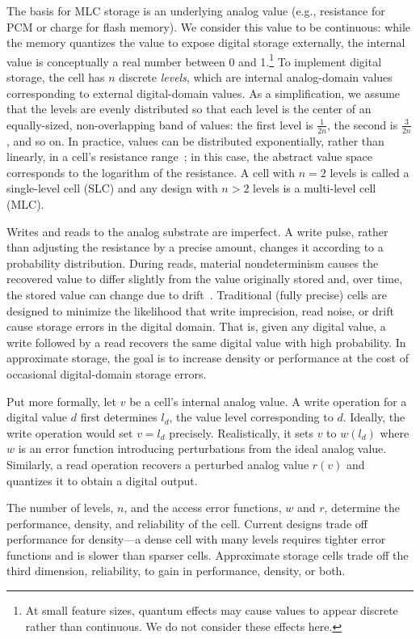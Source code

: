 The basis for MLC storage is an underlying analog value (e.g., resistance for
PCM or charge for flash memory).
We consider this value to be
continuous: while the memory quantizes the value to expose digital
storage externally, the internal value is conceptually
a real number between 0 and 1.\footnote{At small feature sizes, quantum effects may
cause values to appear discrete rather than
continuous. We do not consider these effects here.}
To implement
digital storage, the cell has $n$ discrete \emph{levels}, which are
internal analog-domain values corresponding to
external digital-domain values. As a simplification, we
assume that the levels are evenly distributed so that each level is
the center of an equally-sized, non-overlapping band of values: the
first level is $\frac{1}{2n}$, the second is $\frac{3}{2n}$, and so
on. In practice, values can be distributed exponentially, rather
    than linearly, in a cell's resistance range~\cite{mlcibm,partialreset}; in this case, the abstract value space corresponds
to the logarithm of the resistance. A cell with $n=2$ levels is
called a single-level cell (SLC) and any design with $n
> 2$ levels is a multi-level cell (MLC).

Writes and reads to the analog substrate are imperfect. A write
pulse, rather than adjusting the resistance by a precise amount,
changes it according to a probability distribution. During
reads, material nondeterminism causes the recovered value to differ
slightly from the value originally stored and, over time, the stored
value can change due to drift~\cite{wdddmlcpcm}.
Traditional (fully precise) cells are designed to minimize the
likelihood that write imprecision, read noise, or drift cause storage
errors in the digital domain. That is, given any digital value, a
write followed by a read recovers the same digital value with
high probability. In approximate storage, the goal is to increase
density or performance at the cost of occasional digital-domain
storage errors.

Put more formally, let $v$ be a cell's internal analog value. A
write operation for a digital value $d$ first determines
$l_d$, the value level corresponding to
$d$. Ideally, the write operation would set $v = l_d$ precisely.
Realistically, it sets $v$ to $w(l_d)$ where $w$ is an error
function introducing perturbations from the ideal analog value.
Similarly, a read operation recovers a perturbed analog value $r(v)$ and
quantizes it to obtain a digital output.

The number of levels, $n$, and the access error functions, $w$ and
$r$, determine the performance, density, and reliability of the cell.
Current designs trade off performance
for density---a dense cell with many levels requires tighter error
functions and is slower than sparser cells. Approximate
storage cells trade off the third dimension, reliability, to gain in
performance, density, or both.

